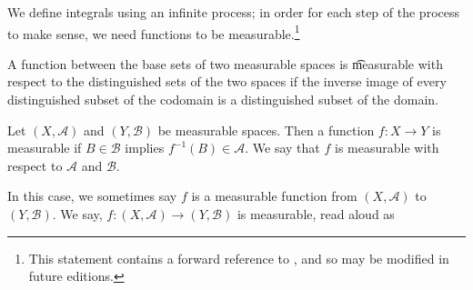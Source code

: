 

We define integrals using an infinite process; in order for each step of the process to make sense, we need functions to be measurable.\footnote{This statement contains a forward reference to , and so may be modified in future editions.}


A function between the base sets of two measurable spaces is
\t{measurable}
with respect to the distinguished
sets of the two spaces if the
inverse image of every
distinguished subset of the
codomain is a distinguished
subset of the domain.


Let $(X, \mathcal{A})$
and $(Y, \mathcal{B})$
be measurable spaces.
Then a function
$f: X \to Y$ is measurable
if $B \in \mathcal{B}$
implies $f^{-1}(B) \in \mathcal{A}$.
We say that $f$ is measurable
with respect to $\mathcal{A}$ and
$\mathcal{B}$.

In this case, we sometimes say
$f$ is a measurable function
from $(X, \mathcal{A})$ to
$(Y, \mathcal{B})$.
We say,
$f: (X, \mathcal{A}) \to (Y, \mathcal{B})$
is measurable, read aloud as

\blankpage
